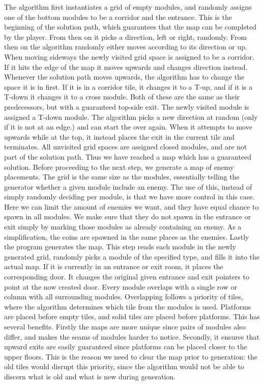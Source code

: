 The algorithm first instantiates a grid of empty modules, and randomly assigns one of the bottom modules to be a corridor and the entrance. This is the beginning of the solution path, which guarantees that the map can be completed by the player. From then on it picks a direction, left or right, randomly. From then on the algorithm randomly either moves according to its direction or up. When moving sideways the newly visited grid space is assigned to be a corridor. If it hits the edge of the map it moves upwards and changes direction instead. Whenever the solution path moves upwards, the algorithm has to change the space it is in first. If it is in a corridor tile, it changes it to a T-up, and if it is a T-down it changes it to a cross module. Both of these are the same as their predecessors, but with a guaranteed top-side exit. The newly visited module is assigned a T-down module. The algorithm picks a new direction at random (only if it is not at an edge.) and can start the over again. When it attempts to move upwards while at the top, it instead places the exit in the current tile and terminates. All unvisited grid spaces are assigned closed modules, and are not part of the solution path. Thus we have reached a map which has a guaranteed solution.
\newline
Before proceeding to the next step, we generate a map of enemy placements. The grid is the same size as the modules, essentially telling the generator whether a given module include an enemy. The use of this, instead of simply randomly deciding per module, is that we have more control in this case. Here we can limit the amount of enemies we want, and they have equal chance to spawn in all modules. We make sure that they do not spawn in the entrance or exit simply by marking those modules as already containing an enemy. As a simplification, the coins are spawned in the same places as the enemies.
\newline
Lastly the program generates the map. This step reads each module in the newly generated grid, randomly picks a module of the specified type, and fills it into the actual map. If it is currently in an entrance or exit room, it places the corresponding door. It changes the original given entrance and exit pointers to point at the now created door.
\newline
Every module overlaps with a single row or column with all surrounding modules. Overlapping follows a priority of tiles, where the algorithm determines which tile from the modules is used. Platforms are placed before empty tiles, and solid tiles are placed before platforms. This has several benefits. Firstly the maps are more unique since pairs of modules also differ, and makes the seams of modules harder to notice. Secondly, it ensures that upward exits are easily guaranteed since platforms can be placed closer to the upper floors. This is the reason we need to clear the map prior to generation: the old tiles would disrupt this priority, since the algorithm would not be able to discern what is old and what is new during generation.

